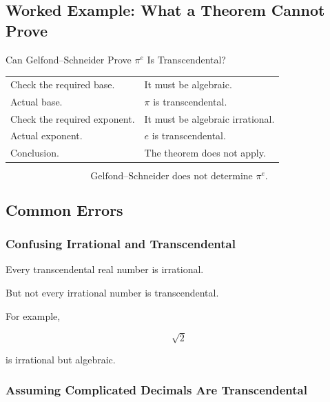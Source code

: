 \subsection{Worked Example: What a Theorem Cannot Prove}
\label{subsec:worked-transcendence-theorem-limit}

\begin{workedexamplebox}{Can Gelfond--Schneider Prove \(\pi^e\) Is Transcendental?}

\begin{tabularx}{\textwidth}{@{}>{\raggedright\arraybackslash}p{}X@{}}
Check the required base. & It must be algebraic.\\
Actual base. & \(\pi\) is transcendental.\\
Check the required exponent. & It must be algebraic irrational.\\
Actual exponent. & \(e\) is transcendental.\\
Conclusion. & The theorem does not apply.
\end{tabularx}

\begin{answerbox}
\[ \boxed{\text{Gelfond--Schneider does not determine }\pi^e.} \]
\end{answerbox}
\end{workedexamplebox}

\subsection{Common Errors}
\label{subsec:transcendental-number-theory-common-errors}

\subsubsection{Confusing Irrational and Transcendental}

Every transcendental real number is irrational.

But not every irrational number is transcendental.

For example,

\[ \sqrt2 \]

is irrational but algebraic.

\subsubsection{Assuming Complicated Decimals Are Transcendental}

